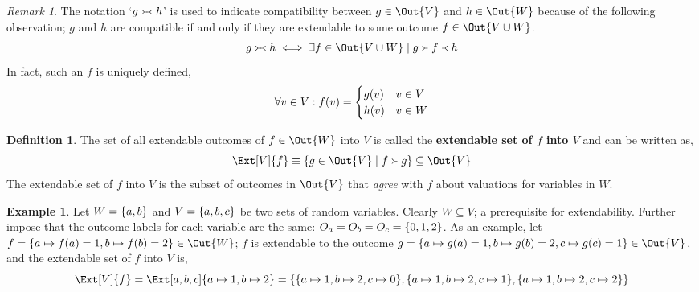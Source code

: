 \documentclass[aps, 10pt, english, twoside, pra, nofootinbib, longbibliography]{revtex4-1}
\theoremstyle{plain}
\theoremstyle{definition}
\newtheorem{definition}[theorem]{Definition}
\newtheorem{example}[theorem]{Example}
\theoremstyle{remark}
\newtheorem{remark}[theorem]{Remark}
\newcommand{\com}{\mathrel{\Yright\hspace{-0.2em}\Yleft}}
\newcommand{\ext}{\mathrel{\Yright}}
\newcommand{\res}{\mathrel{\Yleft}}
\newcommand{\term}[1]{\textcolor{Mahogany}{\textbf{#1}}}
\newcommand{\outc}[1]{o\bs{#1}} %
\begin{document}
    \begin{remark}
        The notation `$g \com h$' is used to indicate compatibility between $g \in \Out{V}$ and $h \in \Out{W}$ because of the following observation; $g$ and $h$ are compatible if and only if they are extendable to some outcome $f \in \Out{V \cup W}$.
        \[ g \com h \iff \exists f \in \Out{V \cup W} \mid g \ext f \res h \]
        In fact, such an $f$ is uniquely defined,
        \[ \forall v \in V : f\br{v} = \begin{cases}
            g\br{v} & v \in V \\
            h\br{v} & v \in W
        \end{cases} \]
    \end{remark}

    \begin{definition}
        \label{def:extendable_set}
        The set of all extendable outcomes of $f \in \Out{W}$ into $V$ is called the \term{extendable set of $f$ into $V$} and can be written as,
        \[ \Ext[V]{f} \defined \bc{g \in \Out{V} \mid f \ext g} \subseteq \Out{V} \]
        The extendable set of $f$ into $V$ is the subset of outcomes in $\Out{V}$ that \textit{agree} with $f$ about valuations for variables in $W$.
    \end{definition}


    \begin{example}
        Let $W = \bc{a, b}$ and $V = \bc{a, b, c}$ be two sets of random variables. Clearly $W \subseteq V$; a prerequisite for extendability. Further impose that the outcome labels for each variable are the same: $O_a = O_b = O_c = \bc{0,1,2}$. As an example, let $f = \bc{a \mapsto f\br{a} = 1, b \mapsto f\br{b} = 2} \in \Out{W}$; $f$ is extendable to the outcome $g = \bc{a \mapsto g\br{a} = 1, b \mapsto g\br{b} = 2, c \mapsto g\br{c} = 1} \in \Out{V}$, and the extendable set of $f$ into $V$ is,
        \[ \Ext[V]{f} = \Ext[a,b,c]{a \mapsto 1, b \mapsto 2} = \bc{\bc{a \mapsto 1, b \mapsto 2, c \mapsto 0}, \bc{a \mapsto 1, b \mapsto 2, c \mapsto 1}, \bc{a \mapsto 1, b \mapsto 2, c \mapsto 2}} \]
    \end{example}

\end{document}
